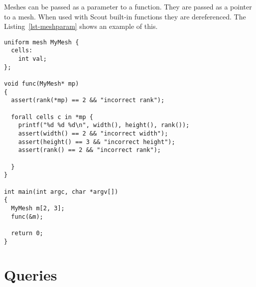 Meshes can be passed as a parameter to a function.  They are passed as a pointer to a mesh.  When used with Scout built-in functions they are dereferenced.
The Listing~\ref{lst-meshparam} shows an example of this.
\par\bigskip
\begin{lstlisting}[float=h,label=lst-meshparam,
	caption={Meshes can be passed as a parameter to a function.}]
uniform mesh MyMesh {
  cells:
    int val;
};

void func(MyMesh* mp)
{
  assert(rank(*mp) == 2 && "incorrect rank");

  forall cells c in *mp {
    printf("%d %d %d\n", width(), height(), rank());
    assert(width() == 2 && "incorrect width"); 
    assert(height() == 3 && "incorrect height"); 
    assert(rank() == 2 && "incorrect rank"); 

  }
}

int main(int argc, char *argv[])
{
  MyMesh m[2, 3];
  func(&m);

  return 0;
}
\end{lstlisting}
\par\bigskip\noindent


\section{Queries}






